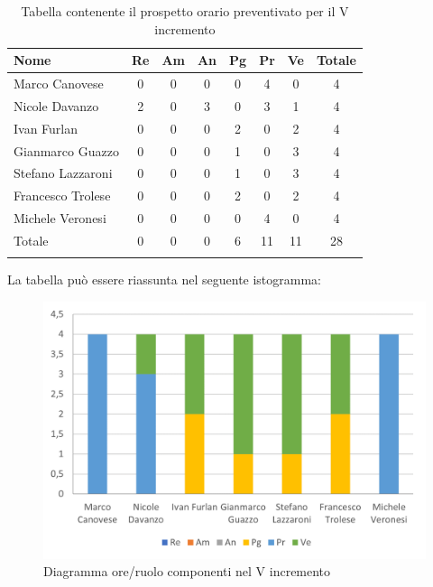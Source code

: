 \begin{longtable}{|l|c|c|c|c|c|c|c|}
	\hline
	\rowcolor{lighter-grayer}
	\textbf{Nome}     & \textbf{Re} & \textbf{Am} & \textbf{An} & \textbf{Pg} & \textbf{Pr} & \textbf{Ve} & \textbf{Totale} \\
	\hline
	\endfirsthead

	\hline
	Marco Canovese    & 0           & 0           & 0           & 0           & 4           & 0           & 4               \\
	\hline
	\hline
	Nicole Davanzo    & 2           & 0           & 3           & 0           & 3           & 1           & 4               \\
	\hline
	\hline
	Ivan Furlan       & 0           & 0           & 0           & 2           & 0           & 2           & 4               \\
	\hline
	\hline
	Gianmarco Guazzo  & 0           & 0           & 0           & 1           & 0           & 3           & 4               \\
	\hline
	\hline
	Stefano Lazzaroni & 0           & 0           & 0           & 1           & 0           & 3           & 4               \\
	\hline
	\hline
	Francesco Trolese & 0           & 0           & 0           & 2           & 0           & 2           & 4               \\
	\hline
	\hline
	Michele Veronesi  & 0           & 0           & 0           & 0           & 4           & 0           & 4               \\
	\hline
	\hline
	Totale            & 0           & 0          & 0          & 6           & 11           & 11          & 28              \\
	\hline
	\rowcolor{white}
	\caption{Tabella contenente il prospetto orario preventivato per il V incremento}
\end{longtable}


La tabella può essere riassunta nel seguente istogramma:

\begin{figure}[H]
	\centering
	\includegraphics[width=0.8\linewidth]{res/images/preventivo/dettaglio_implementazione/2-1.png}
	\caption{Diagramma ore/ruolo componenti nel V incremento}
	\label{fig:diagramma suddivisione ruoli V incremento}
\end{figure}

